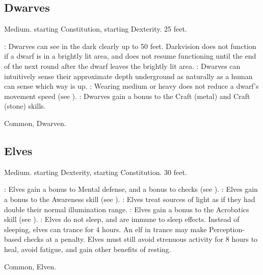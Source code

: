 \subsection{Dwarves}
 Medium.
  starting Constitution,  starting Dexterity.
 25 feet.
\begin{itemize}
    : Dwarves can see in the dark clearly up to 50 feet. Darkvision does not function if a dwarf is in a brightly lit area, and does not resume functioning until the end of the next round after the dwarf leaves the brightly lit area.
    : Dwarves can intuitively sense their approximate depth underground as naturally as a human can sense which way is up.
    : Wearing medium or heavy  does not reduce a dwarf's movement speed (see ).
    : Dwarves gain a  bonus to the Craft (metal) and Craft (stone) skills.
\end{itemize}
 Common, Dwarven.

\subsection{Elves}
 Medium.
  starting Dexterity,  starting Constitution.
 30 feet.
\begin{itemize}
    : Elves gain a  bonus to Mental defense, and a  bonus to  checks (see ).
    : Elves gain a  bonus to the Awareness skill (see ).
    : Elves treat sources of light as if they had double their normal illumination range.
    : Elves gain a  bonus to the Acrobatics skill (see ).
    : Elves do not sleep, and are immune to sleep effects. Instead of sleeping, elves can trance for 4 hours. An elf in trance may make Perception-based checks at a  penalty. Elves must still avoid strenuous activity for 8 hours to heal, avoid fatigue, and gain other benefits of resting.
\end{itemize}
 Common, Elven.

